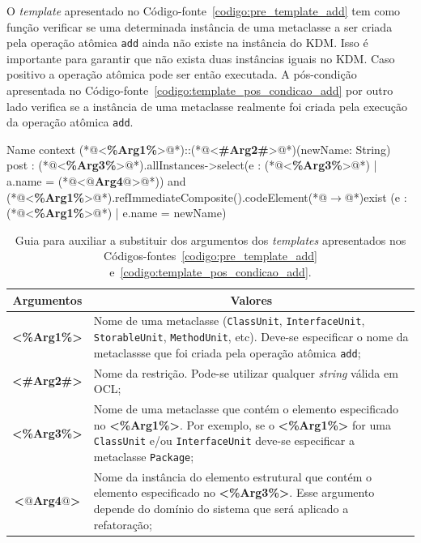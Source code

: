 O \textit{template} apresentado no Código-fonte~\ref{codigo:pre_template_add} tem como função verificar se uma determinada instância de uma metaclasse a ser criada pela operação atômica \texttt{add} ainda não existe na instância do KDM. Isso é importante para garantir que não exista duas instâncias iguais no KDM. Caso positivo a operação atômica pode ser então executada. A pós-condição apresentada no Código-fonte~\ref{codigo:template_pos_condicao_add} por outro lado verifica se a instância de uma metaclasse realmente foi criada pela execução da operação atômica \texttt{add}.

\begin{codigo}[caption={[\textit{Template} OCL para realizar a pós-condição da operação atômica \texttt{add}.] \textit{Template} OCL para realizar a pós-condição da operação atômica \texttt{add}.},escapeinside={(*@}{@*)}, basicstyle=\footnotesize, label={codigo:template_pos_condicao_add}, language=OCL]{Name}
context (*@<\textbf{\%Arg1\%}>@*)::(*@<\textbf{\#Arg2\#}>@*)(newName: String)
post : (*@<\textbf{\%Arg3\%}>@*).allInstances->select(e : (*@<\textbf{\%Arg3\%}>@*) | a.name = (*@<\textbf{$@$Arg4$@$}>@*)) and (*@<\textbf{\%Arg1\%}>@*).refImmediateComposite().codeElement(*@$\rightarrow$@*)exist (e : (*@<\textbf{\%Arg1\%}>@*) | e.name = newName)
\end{codigo}

\begin{table}[h]
\centering
\caption{Guia para auxiliar a substituir dos argumentos dos \textit{templates} apresentados nos Códigos-fontes~\ref{codigo:pre_template_add} e~\ref{codigo:template_pos_condicao_add}.}
\label{tab:guia_template_pre_pos_add}
\begin{tabular}{ | m{1.7cm} | m{12cm}| } 
\hline
\multicolumn{1}{|c|}{Argumentos}                                         & \multicolumn{1}{c|}{Valores} \\ \hline
\multicolumn{1}{|c|}{\textbf{<\%Arg1\%>}} & Nome de uma metaclasse (\texttt{ClassUnit}, \texttt{InterfaceUnit}, \texttt{StorableUnit}, \texttt{MethodUnit}, etc). Deve-se especificar o nome da metaclassse que foi criada pela operação atômica \texttt{add}; \\ 
\hline
\multicolumn{1}{|c|}{\textbf{<\#Arg2\#>}} & Nome da restrição. Pode-se utilizar qualquer \textit{string} válida em OCL; \\ 
\hline
\multicolumn{1}{|c|}{\textbf{<\%Arg3\%>}} & Nome de uma metaclasse que contém o elemento especificado no \textbf{<\%Arg1\%>}. Por exemplo, se o \textbf{<\%Arg1\%>} for uma \texttt{ClassUnit} e/ou \texttt{InterfaceUnit} deve-se especificar a metaclasse \texttt{Package}; \\ 
\hline
\multicolumn{1}{|c|}{\textbf{<$@$Arg4$@$>}} & Nome da instância do elemento estrutural que contém o elemento especificado no \textbf{<\%Arg3\%>}. Esse argumento depende do domínio do sistema que será aplicado a refatoração; \\ 
\hline
\end{tabular}
\end{table}

